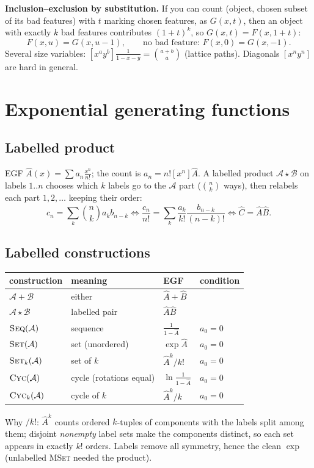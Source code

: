 	\textbf{Inclusion--exclusion by substitution.} If you can count (object, chosen subset of its bad features) with $t$ marking chosen features, as $G(x,t)$, then an object with exactly $k$ bad features contributes $(1+t)^k$, so $G(x,t)=F(x,1+t)$:
	\[F(x,u)=G(x,u-1),\qquad\text{no bad feature: }F(x,0)=G(x,-1).\]
	Several size variables: $[x^ay^b]\frac1{1-x-y}=\binom{a+b}a$ (lattice paths). Diagonals $[x^ny^n]$ are hard in general.

\section{Exponential generating functions}
	\subsection{Labelled product}
	EGF $\hat A(x)=\sum a_n\frac{x^n}{n!}$; the count is $a_n=n![x^n]\hat A$. A labelled product $\mathcal A\star\mathcal B$ on labels $1..n$ chooses which $k$ labels go to the $\mathcal A$ part ($\binom nk$ ways), then relabels each part $1,2,\dots$ keeping their order:
	\[c_n=\sum_k\binom nka_kb_{n-k}\iff\frac{c_n}{n!}=\sum_k\frac{a_k}{k!}\frac{b_{n-k}}{(n-k)!}\iff\hat C=\hat A\hat B.\]

	\subsection{Labelled constructions}
	\begin{center}\small\renewcommand{\arraystretch}{1.3}
	\begin{tabular}{@{}l@{\ \ }l@{\ \ }l@{\ \ }l@{}}
	construction & meaning & EGF & condition \\ \hline
	$\mathcal A+\mathcal B$ & either & $\hat A+\hat B$ & \\
	$\mathcal A\star\mathcal B$ & labelled pair & $\hat A\hat B$ & \\
	$\textsc{Seq}(\mathcal A)$ & sequence & $\frac1{1-\hat A}$ & $a_0=0$ \\
	$\textsc{Set}(\mathcal A)$ & set (unordered) & $\exp\hat A$ & $a_0=0$ \\
	$\textsc{Set}_k(\mathcal A)$ & set of $k$ & $\hat A^k/k!$ & $a_0=0$ \\
	$\textsc{Cyc}(\mathcal A)$ & cycle (rotations equal) & $\ln\frac1{1-\hat A}$ & $a_0=0$ \\
	$\textsc{Cyc}_k(\mathcal A)$ & cycle of $k$ & $\hat A^k/k$ & $a_0=0$ \\
	\end{tabular}
	\end{center}
	Why $/k!$: $\hat A^k$ counts ordered $k$-tuples of components with the labels split among them; disjoint \emph{nonempty} label sets make the components distinct, so each set appears in exactly $k!$ orders. Labels remove all symmetry, hence the clean $\exp$ (unlabelled \textsc{MSet} needed the product).

